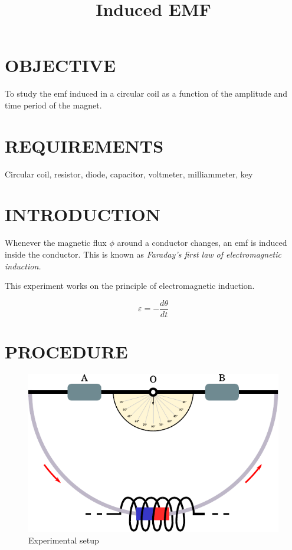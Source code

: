 \documentclass[12pt,a4paper]{article}
\title{Induced EMF}
\begin{document}
 
	\maketitle
	\section{OBJECTIVE}
		To study the emf induced in a circular coil as a function of the amplitude and time period of the magnet.
		
	\section{REQUIREMENTS}
		Circular coil, resistor, diode, capacitor, voltmeter, milliammeter, key
		
	\section{INTRODUCTION}
		
		Whenever the magnetic flux $\phi$ around a conductor changes, an emf is induced inside the conductor. This is known as \textit{Faraday's first law of electromagnetic induction.} 
		
		This experiment works on the principle of electromagnetic induction.
		
		$$\varepsilon=-\dfrac{d\theta}{dt}$$
	\section{PROCEDURE}
		\begin{figure}[!htb]
			\centering
			\includegraphics[scale=1]{emf-setup.pdf}
			\caption{Experimental setup}
		\end{figure}
		
\end{document}
